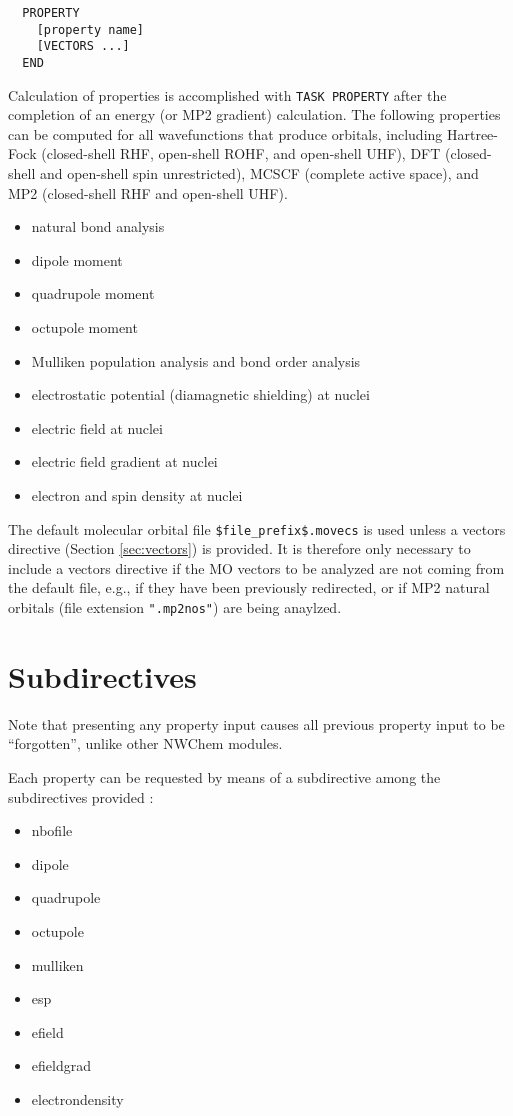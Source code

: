 \label{sec:property}
\begin{verbatim}
  PROPERTY
    [property name]
    [VECTORS ...]
  END
\end{verbatim}

Calculation of properties is accomplished with \verb+TASK PROPERTY+
after the completion of an energy (or MP2 gradient) calculation.  The
following properties can be computed for all wavefunctions that produce
orbitals, including Hartree-Fock (closed-shell RHF, open-shell ROHF, and
open-shell UHF), DFT (closed-shell and open-shell spin unrestricted),
MCSCF (complete active space), and MP2 (closed-shell RHF and open-shell
UHF).

\begin{itemize}
\item natural bond analysis
\item dipole moment
\item quadrupole moment
\item octupole moment
\item Mulliken population analysis and bond order analysis
\item electrostatic potential (diamagnetic shielding) at nuclei 
\item electric field at nuclei 
\item electric field gradient at nuclei 
\item electron and spin density at nuclei 
\end{itemize}

The default molecular orbital file \verb+$file_prefix$.movecs+ is used
unless a vectors directive (Section \ref{sec:vectors}) is provided.  It is
therefore only necessary to include a vectors directive if the MO vectors
to be analyzed are not coming from the default file, e.g., if they have
been previously redirected, or if MP2 natural orbitals (file extension
\verb+".mp2nos"+) are being anaylzed.

\section{Subdirectives}

Note that presenting any property input causes all previous property input
to be ``forgotten'', unlike other NWChem modules.

Each property can be requested by means of a subdirective among the
subdirectives provided :

\begin{itemize}
\item nbofile
\item dipole
\item quadrupole
\item octupole
\item mulliken
\item esp
\item efield
\item efieldgrad
\item electrondensity
\end{itemize}

